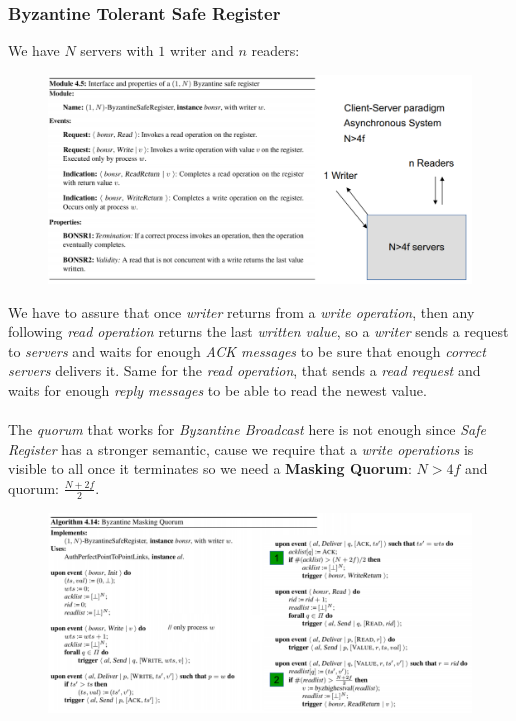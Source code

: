 \documentclass{article}
\begin{document}
\subsubsection{Byzantine Tolerant Safe Register}
We have $N$ servers with $1$ writer and $n$ readers:
\begin{figure}[H]
  \centering
  \includegraphics[scale=0.9,left]{cattura88.png}
\end{figure}
We have to assure that once \emph{writer} returns from a \emph{write operation}, then any following \emph{read operation} returns the last \emph{written value}, so a \emph{writer} sends a request to \emph{servers} and waits for enough \emph{ACK messages} to be sure that enough \emph{correct servers} delivers it. Same for the \emph{read operation}, that sends a \emph{read request} and waits for enough \emph{reply messages} to be able to read the newest value. \\\\
The \emph{quorum} that works for \emph{Byzantine Broadcast} here is not enough since \emph{Safe Register} has a stronger semantic, cause we require that a \emph{write operations} is visible to all once it terminates so we need a \textbf{Masking Quorum}: $N>4f$ and quorum: $\frac{N+2f}{2}$.
\begin{figure}[H]
  \centering
  \includegraphics[scale=0.95,left]{cattura89.png}
\end{figure}
\end{document}
